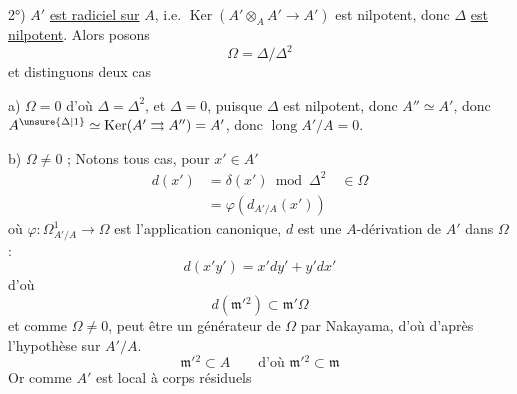 2°) $A'$ \uline{est radiciel sur} $A$, i.e. $\operatorname{Ker}(A'\otimes_{A} A'\to A')$
est nilpotent, donc $\Delta$ \uline{est nilpotent}. Alors
posons
\[
\Omega=\Delta/\Delta^2
\]
et distinguons deux cas

a) $\Omega=0$ d'où $\Delta=\Delta^2$,  et $\Delta=0$,
puisque $\Delta$ est nilpotent, donc $A''\simeq A'$, donc
$A^{\unsure{\Delta|1}}\simeq\operatorname{Ker}(A'\rightrightarrows A'')=A'$, donc $\operatorname{long} A'/A=0$.

b) $\Omega\ne0$ ; Notons  tous cas, 
pour $x'\in A'$
\[
\begin{aligned}
d(x')&=\delta(x')\bmod\Delta^2\quad\in\Omega\\
&=\varphi(d_{A'/A}(x'))
\end{aligned}
\]
où $\varphi:\Omega^1_{A'/A}\to\Omega$ est l'application canonique,
$d$ est une $A$-dérivation de $A'$ dans $\Omega$ :
\[
d(x'y')=x'dy'+y'dx'
\]
d'où
\[
d(\mathfrak m'{}^2)\subset\mathfrak m'\Omega
\]
et comme $\Omega\ne0$,  
peut être un générateur de $\Omega$ par Nakayama,
d'où d'après  l'hypothèse sur $A'/A$.
\[
\mathfrak m'{}^2\subset A\qquad\text{d'où }\mathfrak m'{}^2\subset\mathfrak m \tag*{$(*)$}
\]
Or comme $A'$ est local à corps résiduels
